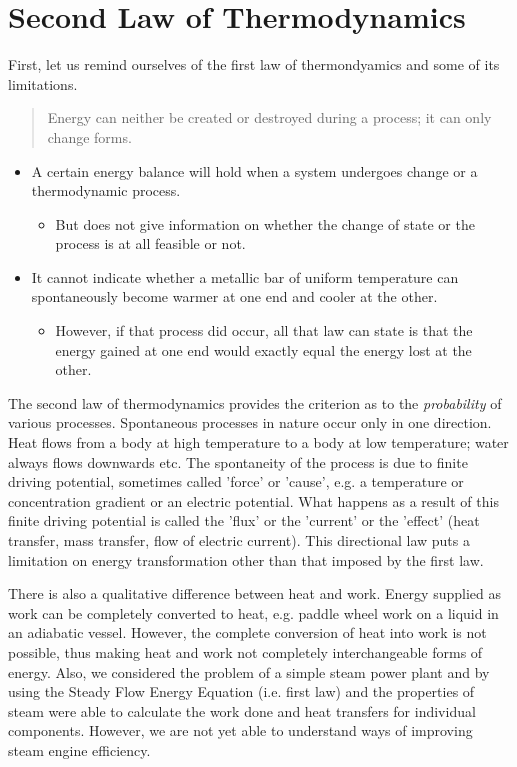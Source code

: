 \documentclass[class=report, crop=false, 12pt,a4paper]{standalone}
\begin{document}
\section{Second Law of Thermodynamics}
First, let us remind ourselves of the first law of thermondyamics and some of its limitations. 
\begin{quote}
  \begin{center}
    Energy can neither be created or destroyed during a process; it can only change forms.
  \end{center}
\end{quote}
\begin{itemize}[noitemsep]
  \item A certain energy balance will hold when a system undergoes change or a thermodynamic process.
  \begin{itemize}
    \item But does not give information on whether the change of state or the process is at all feasible or not.
  \end{itemize}
  \item It cannot indicate whether a metallic bar of uniform temperature can spontaneously become warmer at one end and cooler at the other.
  \begin{itemize}
    \item However, if that process did occur, all that law can state is that the energy gained at one end would exactly equal the energy lost at the other.
  \end{itemize}
\end{itemize}
The second law of thermodynamics provides the criterion as to the \emph{probability} of various processes. Spontaneous processes in nature occur only in one direction. Heat flows from a body at high temperature to a body at low temperature; water always flows downwards etc. The spontaneity of the process is due to finite driving potential, sometimes called 'force' or 'cause', e.g. a temperature or concentration gradient or an electric potential. What happens as a result of this finite driving potential is called the 'flux' or the 'current' or the 'effect' (heat transfer, mass transfer, flow of electric current). This directional law puts a limitation on energy transformation other than that imposed by the first law. 

There is also a qualitative difference between heat and work. Energy supplied as work can be completely converted to heat, e.g. paddle wheel work on a liquid in an adiabatic vessel. However, the complete conversion of heat into work is not possible, thus making heat and work not completely interchangeable forms of energy. Also, we considered the problem of a simple steam power plant and by using the Steady Flow Energy Equation (i.e. first law) and the properties of steam were able to calculate the work done and heat transfers for individual components. However, we are not yet able to understand ways of improving steam engine efficiency.
\end{document}
